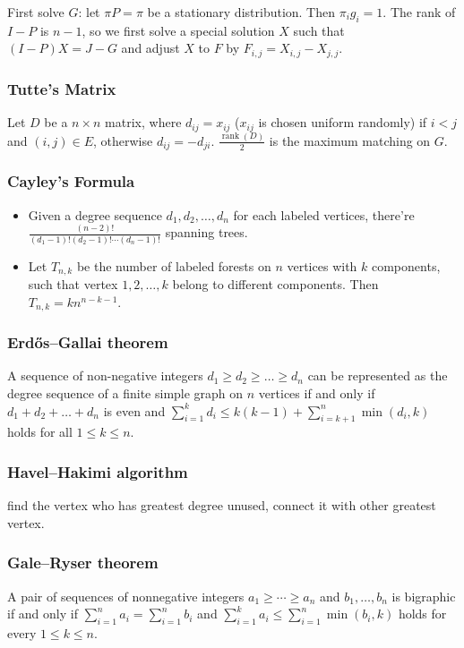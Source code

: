 First solve $G$: let $\pi P = \pi$ be a stationary distribution. Then $\pi_i g_i = 1$.
The rank of $I - P$ is $n - 1$, so we first solve a special solution $X$ such that $(I - P)X = J - G$ and adjust $X$ to $F$ by
$F_{i,j} = X_{i,j} - X_{j,j}$.

\subsubsection{Tutte's Matrix}
Let $D$ be a $n \times n$ matrix, where $d_{ij} = x_{ij}$ ($x_{ij}$ is chosen uniform randomly) if $i < j$ and $(i, j) \in E$, otherwise $d_{ij} = -d_{ji}$. $\frac{\operatorname{rank}(D)}{2}$ is the maximum matching on $G$.

\subsubsection{Cayley's Formula}
\begin{itemize}[nosep]
  \item Given a degree sequence $d_1, d_2, \ldots, d_n$ for each labeled vertices, there're $\frac{(n - 2)!}{(d_1 - 1)!(d_2 - 1)!\cdots(d_n - 1)!}$ spanning trees.
  \item Let $T_{n, k}$ be the number of labeled forests on $n$ vertices with $k$ components, such that vertex $1, 2, \ldots, k$ belong to different components. Then $T_{n, k} = kn^{n - k - 1}$.
\end{itemize}

\subsubsection{Erdős–Gallai theorem}
A sequence of non-negative integers $d_1 \geq d_2 \geq \ldots \geq d_n$ can be represented as the degree sequence of a finite simple graph on $n$ vertices if and only if $d_1 + d_2 + \ldots + d_n$ is even and
$\sum_{i = 1}^{k}d_i \leq k(k - 1) + \sum_{i = k + 1}^{n}\min(d_i, k)$
holds for all $1 \leq k \leq n$.

\subsubsection{Havel–Hakimi algorithm}
find the vertex who has greatest degree unused, connect it with other greatest vertex.

\subsubsection{Gale–Ryser theorem}
A pair of sequences of nonnegative integers $a_1\ge\cdots\ge a_n$ and $b_1,\ldots,b_n$ is bigraphic if and only if $\sum_{i=1}^n a_i=\sum_{i=1}^n b_i$ and $\sum_{i=1}^k a_i\le \sum_{i=1}^n\min(b_i,k)$ holds for every $1\le k\le n$.

